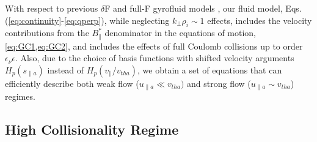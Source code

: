 {{With respect to previous $\delta$F \citep{Dorland1993,Brizard1994} and full-F gyrofluid models \citep{Madsen2013}, our fluid model, Eqs. (\ref{eq:continuity}-\ref{eq:qperp}), while neglecting $k_{\perp} \rho_i \sim 1$ effects, {includes the velocity contributions from} the $B_{\parallel}^*$ denominator in the equations of motion, \cref{eq:GC1,eq:GC2}, and includes the effects of full Coulomb collisions up to order $\epsilon_\nu \epsilon$.
{Also, due to the choice of basis functions with shifted velocity arguments $H_p(s_{\parallel a})$ instead of $H_p(v_\parallel/v_{tha})$, we obtain a set of equations that can efficiently describe both weak flow ($u_{\parallel a} \ll v_{th a})$ and strong flow ($u_{\parallel a} \sim v_{th a}$) regimes}.

\subsection{High Collisionality Regime}
\label{sec:highcoll}

}}
